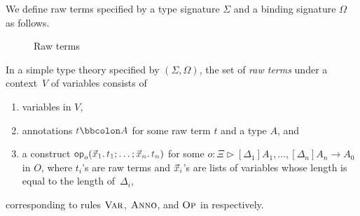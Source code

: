 We define raw terms specified by a type signature $\Sigma$ and a binding signature $\Omega$ as follows.
\begin{definition}
\begin{figure}
  \centering
  \small
  \caption{Raw terms}
  \label{fig:raw-terms}
\end{figure}
  In a simple type theory specified by $(\Sigma, \Omega)$, the set of \emph{raw terms} under a context~$V$ of variables consists of
  \begin{enumerate}
    \item variables in $V$,
    \item annotations $\isTerm{t \annotate A}$ for some raw term $t$ and a type $A$, and
    \item a construct $\tmOpts$ for some $o \colon \Xi \rhd [\Delta_1]A_{1}, \ldots, [\Delta_{n}] A_{n} \to A_0$ in $O$, where $t_i$'s are raw terms and $\vars{x}_{\isTerm{i}}$'s are lists of variables whose length is equal to the length of~$\Delta_i$,
  \end{enumerate}
  corresponding to rules $\textnormal{\textsc{Var}}$, $\textnormal{\textsc{Anno}}$, and $\textnormal{\textsc{Op}}$ in  respectively.
\end{definition}


